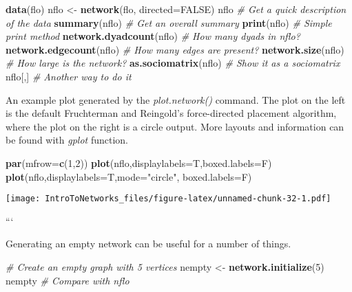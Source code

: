 \documentclass[]{book}
\newenvironment{Shaded}{\begin{snugshade}}{\end{snugshade}}
\newcommand{\KeywordTok}[1]{\textcolor[rgb]{0.13,0.29,0.53}{\textbf{{#1}}}}
\newcommand{\DataTypeTok}[1]{\textcolor[rgb]{0.13,0.29,0.53}{{#1}}}
\newcommand{\DecValTok}[1]{\textcolor[rgb]{0.00,0.00,0.81}{{#1}}}
\newcommand{\StringTok}[1]{\textcolor[rgb]{0.31,0.60,0.02}{{#1}}}
\newcommand{\CommentTok}[1]{\textcolor[rgb]{0.56,0.35,0.01}{\textit{{#1}}}}
\newcommand{\OtherTok}[1]{\textcolor[rgb]{0.56,0.35,0.01}{{#1}}}
\newcommand{\NormalTok}[1]{{#1}}
\theoremstyle{definition}
\theoremstyle{definition}
\theoremstyle{definition}
\theoremstyle{remark}
\begin{document}
\begin{Shaded}
\begin{Highlighting}[]
\KeywordTok{data}\NormalTok{(flo)}
\NormalTok{nflo <-}\StringTok{ }\KeywordTok{network}\NormalTok{(flo, }\DataTypeTok{directed=}\OtherTok{FALSE}\NormalTok{)     }
\NormalTok{nflo   }\CommentTok{# Get a quick description of the data}
\KeywordTok{summary}\NormalTok{(nflo)   }\CommentTok{# Get an overall summary}
\KeywordTok{print}\NormalTok{(nflo)    }\CommentTok{# Simple print method}
\KeywordTok{network.dyadcount}\NormalTok{(nflo)   }\CommentTok{# How many dyads in nflo?}
\KeywordTok{network.edgecount}\NormalTok{(nflo)     }\CommentTok{# How many edges are present?}
\KeywordTok{network.size}\NormalTok{(nflo)   }\CommentTok{# How large is the network?}
\KeywordTok{as.sociomatrix}\NormalTok{(nflo)   }\CommentTok{# Show it as a sociomatrix}
\NormalTok{nflo[,]   }\CommentTok{# Another way to do it}
\end{Highlighting}
\end{Shaded}

An example plot generated by the \emph{plot.network()} command. The plot
on the left is the default Fruchterman and Reingold's force-directed
placement algorithm, where the plot on the right is a circle output.
More layouts and information can be found with \emph{gplot} function.

\begin{Shaded}
\begin{Highlighting}[]
\KeywordTok{par}\NormalTok{(}\DataTypeTok{mfrow=}\KeywordTok{c}\NormalTok{(}\DecValTok{1}\NormalTok{,}\DecValTok{2}\NormalTok{))}
 \KeywordTok{plot}\NormalTok{(nflo,}\DataTypeTok{displaylabels=}\NormalTok{T,}\DataTypeTok{boxed.labels=}\NormalTok{F) }
 \KeywordTok{plot}\NormalTok{(nflo,}\DataTypeTok{displaylabels=}\NormalTok{T,}\DataTypeTok{mode=}\StringTok{"circle"}\NormalTok{, }\DataTypeTok{boxed.labels=}\NormalTok{F) }
\end{Highlighting}
\end{Shaded}

\texttt{[image: IntroToNetworks\_files/figure-latex/unnamed-chunk-32-1.pdf]}

```

Generating an empty network can be useful for a number of things.

\begin{Shaded}
\begin{Highlighting}[]
 \CommentTok{# Create an empty graph with 5 vertices}
\NormalTok{nempty <-}\StringTok{ }\KeywordTok{network.initialize}\NormalTok{(}\DecValTok{5}\NormalTok{) }
\NormalTok{nempty   }\CommentTok{# Compare with nflo  }
\end{Highlighting}
\end{Shaded}
\end{document}
